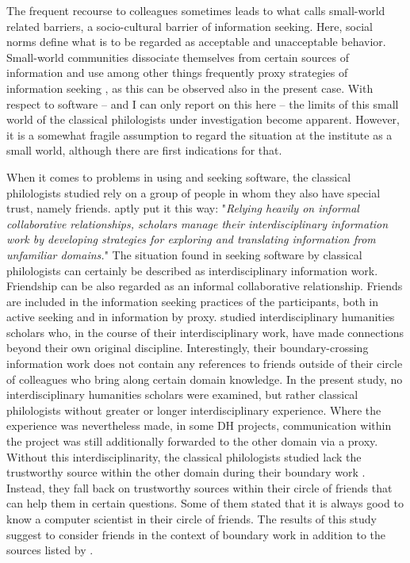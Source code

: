 \documentclass[12pt, a4paper, titlepage, oneside, abstract=true, toc=listof, toc=bibliography, BCOR=1cm]{scrreprt}
\begin{document}
{%
The frequent recourse to colleagues sometimes leads to what \citet[p. 57]{Savolainen2015} calls small-world related barriers, a socio-cultural barrier of information seeking. Here, social norms define what is to be regarded as acceptable and unacceptable behavior. Small-world communities dissociate themselves from certain sources of information and use among other things frequently proxy strategies of information seeking \citep[p. 57]{Savolainen2015}, as this can be observed also in the present case. With respect to software \--- and I can only report on this here \--- the limits of this small world of the classical philologists under investigation become apparent. However, it is a somewhat fragile assumption to regard the situation at the institute as a small world, although there are first indications for that.

When it comes to problems in using and seeking software, the classical philologists studied rely on a group of people in whom they also have special trust, namely friends. \citet[p. 85]{Palmer2002} aptly put it this way: "\textit{Relying heavily on informal collaborative relationships, scholars manage their interdisciplinary information work by developing strategies for exploring and translating information from unfamiliar domains.}" The situation found in seeking software by classical philologists can certainly be described as interdisciplinary information work. Friendship can be also regarded as an informal collaborative relationship. Friends are included in the information seeking practices of the participants, both in active seeking and in information by proxy. \citet{Palmer2002} studied interdisciplinary humanities scholars who, in the course of their interdisciplinary work, have made connections beyond their own original discipline. Interestingly, their boundary-crossing information work does not contain any references to friends outside of their circle of colleagues who bring along certain domain knowledge. In the present study, no interdisciplinary humanities scholars were examined, but rather classical philologists without greater or longer interdisciplinary experience. Where the experience was nevertheless made, in some DH projects, communication within the project was still additionally forwarded to the other domain via a proxy. Without this interdisciplinarity, the classical philologists studied lack the trustworthy source within the other domain during their boundary work \citet{Gieryn1983}. Instead, they fall back on trustworthy sources within their circle of friends that can help them in certain questions. Some of them stated that it is always good to know a computer scientist in their circle of friends. The results of this study suggest to consider friends in the context of boundary work in addition to the sources listed by \citep{Palmer2002}.

}
\end{document}
